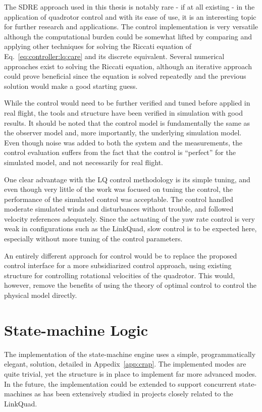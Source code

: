         The SDRE approach used in this thesis is notably rare - if at
        all existing - in the application of quadrotor control
        and with its ease of use, it is an interesting topic for further research and applications.
        The control implementation is very versatile although the computational
        burden could be somewhat lifted by comparing and applying other techniques for solving
        the Riccati equation of Eq.~\eqref{eq:controller:lq:care} and its discrete equivalent.
        Several numerical approaches exist to solving the Riccati equation,
        although an iterative approach could prove beneficial since
        the equation is solved repeatedly and the previous solution would make a
        good starting guess.

        While the control would need to be further verified and tuned before applied in real flight,
        the tools and structure have been verified in simulation with good results.
        It should be noted that the control model is fundamentally the same
        as the observer model and, more importantly, the underlying simulation
        model. Even though noise was added to both the system and the measurements,
        the control evaluation suffers from the fact that the control is ``perfect'' for the
        simulated model, and not necessarily for real flight.

        One clear advantage with the LQ control methodology is its simple
        tuning, and even though very little of the work was focused on
        tuning the control, the performance of the simulated control was acceptable.
        The control handled moderate simulated winds and disturbances without trouble, and
        followed velocity references adequately.
        Since the actuating of the yaw rate control is very weak in
        configurations such as the LinkQuad, slow control
        is to be expected here, especially without more tuning of the control
        parameters.
        
        An entirely different approach for control would be to replace the
        proposed control interface for a more subsidiarized control approach, using
        existing structure for controlling rotational velocities of the
        quadrotor. This would, however, remove the benefits of using
        the theory of optimal control to control the physical model directly.

    \section{State-machine Logic}
        The implementation of the state-machine engine uses a simple, 
        programmatically elegant, solution, detailed in Appedix~\ref{app:crap}. 
        The implemented modes are quite trivial, yet the structure is in place to implement
        far more advanced modes. In the future, the implementation could
        be extended to support concurrent state-machines as has been
        extensively studied in projects closely related to the LinkQuad.


